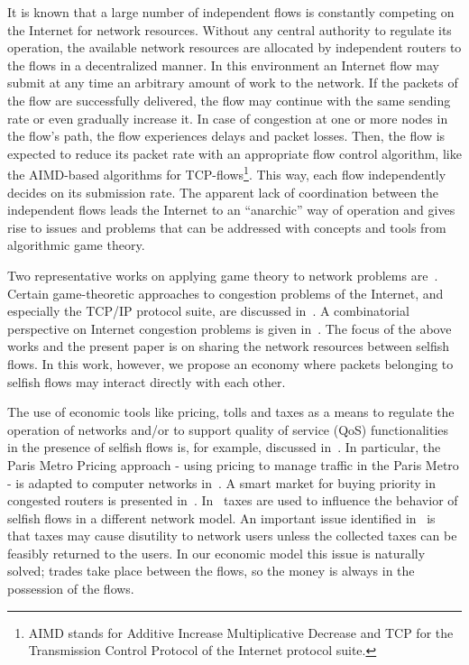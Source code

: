 \documentclass[letterpaper,10pt]{llncs}
\begin{document}
It is known that a large number of independent flows is constantly
competing on the Internet for network resources.
Without any central authority to regulate its
operation, the available network resources are allocated by
independent routers to the flows in a decentralized manner.
In this environment an
Internet flow may submit at any time an arbitrary amount of work to the network.
If the packets of the flow are successfully delivered, the flow may continue with the same
sending rate or even gradually increase it.
In case of congestion at one or more nodes in the flow's path, the
flow experiences delays and packet losses.
Then, the flow is expected to reduce its packet rate with an appropriate flow control algorithm,
like the AIMD-based algorithms for TCP-flows\footnote{AIMD stands for Additive Increase Multiplicative Decrease
and TCP for the Transmission Control Protocol of the Internet protocol suite.}.
This way, each flow independently decides on its submission rate.
The apparent lack of coordination between the independent
flows leads the Internet to an ``anarchic'' way of operation
and gives rise to issues and problems that can be addressed with
concepts and tools from algorithmic game theory.

Two representative works on applying game theory to network problems
are~\cite{KP99,Pa01}.
Certain game-theoretic approaches to congestion problems
of the Internet, and especially the TCP/IP protocol suite,
are discussed in~\cite{Sh95,ASKSP02,GJS04,ETM10}.
A combinatorial perspective on Internet congestion problems is
given in~\cite{KKPS00}. The focus of the above works and the present 
paper is on sharing the network resources between selfish flows.
In this work, however, we propose an economy where packets belonging to selfish flows may
interact directly with each other.

The use of economic tools like pricing, tolls and taxes as a means to regulate
the operation of networks and/or to support quality of service (QoS)
functionalities in the presence of selfish flows is, for example, discussed
in~\cite{Od99,GK95,CDR03STOC,CDR03EC,MV93,MB97}. In particular, the
Paris Metro Pricing approach - using pricing to manage traffic in the Paris Metro -
is adapted to computer networks in~\cite{Od99}. A smart market
for buying priority in congested routers is presented in~\cite{MV93}.
In~\cite{CDR03STOC,CDR03EC} taxes are used to influence the behavior of
selfish flows in a different network model. An important issue identified
in~\cite{CDR03EC} is that taxes may cause disutility to network users unless
the collected taxes can be feasibly returned to the users.
In our economic model this issue is naturally solved; trades take place
between the flows, so the money is always in the possession of the flows.
\end{document}
